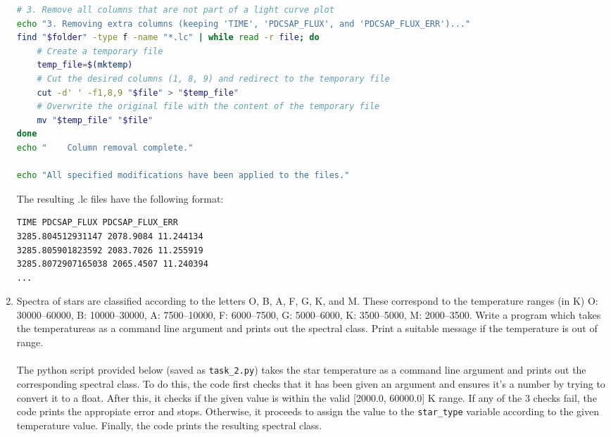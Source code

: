 \documentclass[a4paper,12pt]{article}
\DeclareRobustCommand{\regular}{\fontseries{m}\selectfont}
\DeclareRobustCommand{\bold}{\fontseries{b}\selectfont}
\newcommand{\bcode}[1]{\texttt{\fontsize{11}{13}\selectfont\bold#1}}
\newenvironment{solution}{}{}
\begin{document}
\begin{enumerate}
\begin{solution}
\begin{lstlisting}[language=bash]
# 3. Remove all columns that are not part of a light curve plot
echo "3. Removing extra columns (keeping 'TIME', 'PDCSAP_FLUX', and 'PDCSAP_FLUX_ERR')..."
find "$folder" -type f -name "*.lc" | while read -r file; do
    # Create a temporary file
    temp_file=$(mktemp)
    # Cut the desired columns (1, 8, 9) and redirect to the temporary file
    cut -d' ' -f1,8,9 "$file" > "$temp_file"
    # Overwrite the original file with the content of the temporary file
    mv "$temp_file" "$file"
done
echo "    Column removal complete."

echo "All specified modifications have been applied to the files."\end{lstlisting}
  \vspace{1em}The resulting .lc files have the following format:
  \\\begin{lstlisting}[language=bash]
TIME PDCSAP_FLUX PDCSAP_FLUX_ERR 
3285.804512931147 2078.9084 11.244134
3285.805901823592 2083.7026 11.255919
3285.8072907165038 2065.4507 11.240394
...\end{lstlisting}
  \end{solution}
  \item Spectra of stars are classified according to the letters O, B, A, F, G,
  K, and M. These correspond to the temperature ranges (in K) O: 30000--60000,
  B: 10000--30000, A: 7500--10000, F: 6000--7500, G: 5000--6000, K: 3500--5000,
  M: 2000--3500. Write a program which takes the temperatureas as a command line
  argument and prints out the spectral class. Print a suitable message if the
  temperature is out of range.
  \begin{solution}
    \\\\\regular The python script provided below (saved as \bcode{task\_2.py})
    takes the star temperature as a command line argument and prints out the
    corresponding spectral class. To do this, the code first checks that it has
    been given an argument and ensures it's a number by trying to convert it to
    a float. After this, it checks if the given value is within the valid [2000.0,
    60000.0] K range. If any of the 3 checks fail, the code prints the appropiate
    error and stops. Otherwise, it proceeds to assign the value to the
    \bcode{star\_type} variable according to the given temperature value. Finally,
    the code prints the resulting spectral class.\\
    \begin{lstlisting}[language=python]

\end{lstlisting}
\end{solution}
\end{enumerate}
\end{document}
